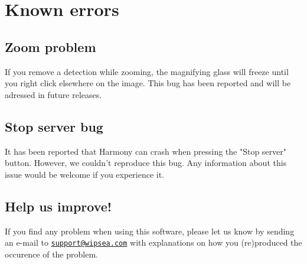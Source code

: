 \documentclass{article}
\begin{document}
\newpage
\section{Known errors}
\subsection{Zoom problem}
If you remove a detection while zooming, the magnifying glass will freeze until you right click elsewhere on the image. This bug has been reported and will be adressed in future releases.

\subsection{Stop server bug}
It has been reported that Harmony can crash when pressing the "Stop server" button. However, we couldn't reproduce this bug. Any information about this issue would be welcome if you experience it.


\subsection{Help us improve!}
\label{subsec:newBug}
If you find any problem when using this software, please let us know by sending an e-mail to \href{mailto:support@wipsea.com}{\nolinkurl{support@wipsea.com}} with explanations on how you (re)produced the occurence of the problem. 
\end{document}

